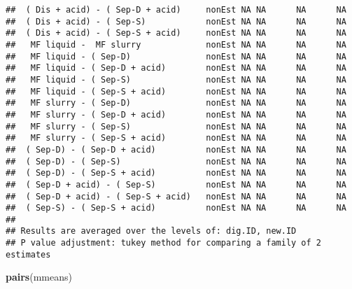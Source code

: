 \documentclass[
]{article}
\newenvironment{Shaded}{\begin{snugshade}}{\end{snugshade}}
\newcommand{\FunctionTok}[1]{\textcolor[rgb]{0.13,0.29,0.53}{\textbf{#1}}}
\newcommand{\NormalTok}[1]{#1}
\begin{document}
\begin{verbatim}
##  ( Dis + acid) - ( Sep-D + acid)     nonEst NA NA      NA      NA
##  ( Dis + acid) - ( Sep-S)            nonEst NA NA      NA      NA
##  ( Dis + acid) - ( Sep-S + acid)     nonEst NA NA      NA      NA
##   MF liquid -  MF slurry             nonEst NA NA      NA      NA
##   MF liquid - ( Sep-D)               nonEst NA NA      NA      NA
##   MF liquid - ( Sep-D + acid)        nonEst NA NA      NA      NA
##   MF liquid - ( Sep-S)               nonEst NA NA      NA      NA
##   MF liquid - ( Sep-S + acid)        nonEst NA NA      NA      NA
##   MF slurry - ( Sep-D)               nonEst NA NA      NA      NA
##   MF slurry - ( Sep-D + acid)        nonEst NA NA      NA      NA
##   MF slurry - ( Sep-S)               nonEst NA NA      NA      NA
##   MF slurry - ( Sep-S + acid)        nonEst NA NA      NA      NA
##  ( Sep-D) - ( Sep-D + acid)          nonEst NA NA      NA      NA
##  ( Sep-D) - ( Sep-S)                 nonEst NA NA      NA      NA
##  ( Sep-D) - ( Sep-S + acid)          nonEst NA NA      NA      NA
##  ( Sep-D + acid) - ( Sep-S)          nonEst NA NA      NA      NA
##  ( Sep-D + acid) - ( Sep-S + acid)   nonEst NA NA      NA      NA
##  ( Sep-S) - ( Sep-S + acid)          nonEst NA NA      NA      NA
## 
## Results are averaged over the levels of: dig.ID, new.ID 
## P value adjustment: tukey method for comparing a family of 2 estimates
\end{verbatim}

\begin{Shaded}
\begin{Highlighting}[]
\FunctionTok{pairs}\NormalTok{(mmeans)}
\end{Highlighting}
\end{Shaded}
\end{document}
